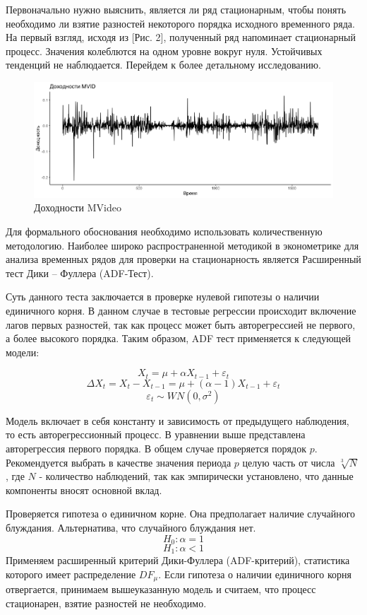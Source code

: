 \documentclass[a4paper,12pt,twoside]{article}
\begin{document}
Первоначально нужно выяснить, является ли ряд стационарным, чтобы понять необходимо ли взятие разностей некоторого порядка исходного временного ряда.
На первый взгляд, исходя из [Рис. 2], полученный ряд напоминает стационарный процесс.
Значения колеблются на одном уровне вокруг нуля.
Устойчивых тенденций не наблюдается.
Перейдем к более детальному исследованию.

\begin{figure}[!h]
    \includegraphics[scale = 0.5]{mvideo_01.png}
    \caption{Доходности MVideo}
    \label{fig:mvideo_01}
\end{figure}

Для формального обоснования необходимо использовать количественную методологию. Наиболее широко распространенной методикой в эконометрике для анализа временных рядов для проверки на стационарность является Расширенный тест Дики – Фуллера (ADF-Тест).

Суть данного теста заключается в проверке нулевой гипотезы о наличии единичного корня.
В данном случае в тестовые регрессии происходит включение лагов первых разностей, так как процесс может быть авторегрессией не первого, а более высокого порядка.
Таким образом, ADF тест применяется к следующей модели:

$$X_t = \mu + \alpha X_{t-1} + \varepsilon_t$$
$$\Delta X_t = X_t-X_{t-1}= \mu + (\alpha-1)X_{t-1} + \varepsilon_t$$
$$\varepsilon_t \sim WN(0, \sigma^2)$$

Модель включает в себя константу и зависимость от предыдущего наблюдения, то есть авторегрессионный процесс.
В уравнении выше представлена авторегрессия первого порядка.
В общем случае проверяется порядок $p$.
Рекомендуется выбрать в качестве значения периода $p$ целую часть от числа $\sqrt[3]{N}$, где $N$ - количество наблюдений, так как эмпирически установлено, что данные компоненты вносят основной вклад.

Проверяется гипотеза о единичном корне.
Она предполагает наличие случайного блуждания.
Альтернатива, что случайного блуждания нет.
$$  H_0: \alpha = 1$$
$$  H_1: \alpha < 1$$
Применяем расширенный критерий Дики-Фуллера (ADF-критерий), статистика которого имеет распределение $DF_{\mu}$.
Если гипотеза о наличии единичного корня отвергается, принимаем вышеуказанную модель и считаем, что процесс стационарен, взятие разностей не необходимо.
\end{document}
